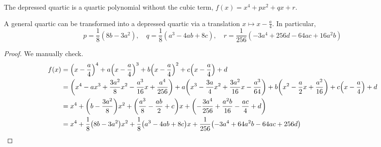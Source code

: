 \begin{definition}
    The depressed quartic is a quartic polynomial without the cubic term,
    \(f(x) = x^4 + px^2 + qx + r\).
\end{definition}

\begin{lemma}
    A general quartic can be transformed into a depressed quartic
    via a translation \(x \mapsto x-\frac{a}{4}\).
    In particular,
    \begin{equation*}
        p = \frac{1}{8}(8b-3a^2), \quad
        q = \frac{1}{8}(a^3-4ab+8c), \quad
        r = \frac{1}{256}(-3a^4+256d-64ac+16a^2b)
    \end{equation*}
\end{lemma}
\begin{proof}
    We manually check.
    \begin{align*}
        f(x) &= \pqty{x-\frac{a}{4}}^4 + a\pqty{x-\frac{a}{4}}^3 + b\pqty{x-\frac{a}{4}}^2 + c\pqty{x-\frac{a}{4}} + d \\
        &= \pqty{x^4 - ax^3 + \frac{3a^2}{8}x^2 - \frac{a^3}{16}x + \frac{a^4}{256}}
        + a\pqty{x^3 - \frac{3a}{4}x^2 + \frac{3a^2}{16}x - \frac{a^3}{64}}
        + b\pqty{x^2 - \frac{a}{2}x + \frac{a^2}{16}} + c\pqty{x-\frac{a}{4}} + d \\
        &= x^4 + \pqty{b-\frac{3a^2}{8}}x^2 + \pqty{\frac{a^3}{8}-\frac{ab}{2}+c}x
        + \pqty{-\frac{3a^4}{256}+\frac{a^2b}{16}-\frac{ac}{4}+d} \\
        &= x^4 + \frac{1}{8}\pqty{8b-3a^2}x^2 + \frac{1}{8}\pqty{a^3-4ab+8c}x
        + \frac{1}{256}\pqty{-3a^4+64a^2b-64ac+256d}
    \end{align*}
\end{proof}

